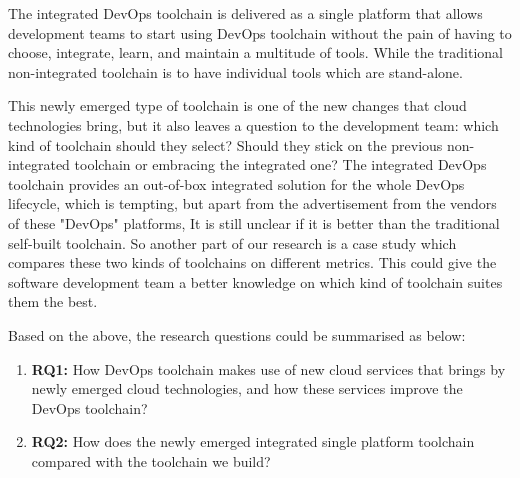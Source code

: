 \par
The integrated DevOps toolchain is delivered as a single platform that allows development teams to start using DevOps toolchain without the pain of having to choose, integrate, learn, and maintain a multitude of tools. While the traditional non-integrated toolchain is to have individual tools which are stand-alone.
\par
This newly emerged type of toolchain is one of the new changes that cloud technologies bring, but it also leaves a question to the development team: which kind of toolchain should they select? Should they stick on the previous non-integrated toolchain or embracing the integrated one? The integrated DevOps toolchain provides an out-of-box integrated solution for the whole DevOps lifecycle, which is tempting, but apart from the advertisement from the vendors of these "DevOps" platforms, It is still unclear if it is better than the traditional self-built toolchain. So another part of our research is a case study which compares these two kinds of toolchains on different metrics. This could give the software development team a better knowledge on which kind of toolchain suites them the best.
\par
Based on the above, the research questions could be summarised as below:
\begin{enumerate}
    \item \textbf{RQ1:} How DevOps toolchain makes use of new cloud services that brings by newly emerged cloud technologies, and how these services improve the DevOps toolchain?
    \item \textbf{RQ2:} How does the newly emerged integrated single platform toolchain compared with the toolchain we build?
\end{enumerate}
